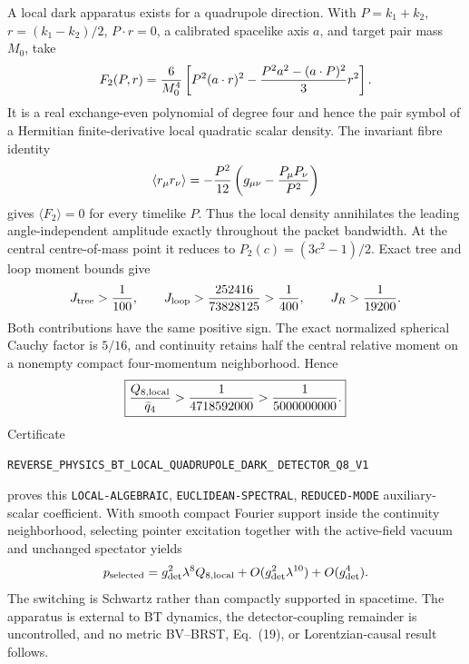 \documentclass[11pt]{article}
\theoremstyle{definition}
\theoremstyle{remark}
\begin{document}
A local dark apparatus exists for a quadrupole direction.  With
$P=k_1+k_2$, $r=(k_1-k_2)/2$, $P\mathbin{\cdot}r=0$, a calibrated spacelike
axis $a$, and target pair mass $M_0$, take
\[
 F_2(P,r)={6\over M_0^4}\left[
 P^2(a\mathbin{\cdot}r)^2
 -{P^2a^2-(a\mathbin{\cdot}P)^2\over3}r^2\right].
\]
It is a real exchange-even polynomial of degree four and hence the pair
symbol of a Hermitian finite-derivative local quadratic scalar density.  The
invariant fibre identity
\[
 \langle r_\mu r_\nu\rangle
 =-{P^2\over12}\left(g_{\mu\nu}-{P_\mu P_\nu\over P^2}\right)
\]
gives $\langle F_2\rangle=0$ for every timelike $P$.  Thus the local density
annihilates the leading angle-independent amplitude exactly throughout the
packet bandwidth.  At the central centre-of-mass point it reduces to
$P_2(c)=(3c^2-1)/2$.  Exact tree and loop moment bounds give
\[
 J_{\rm tree}>{1\over100},\qquad
 J_{\rm loop}>{252416\over73828125}>{1\over400},
 \qquad J_R>{1\over19200}.
\]
Both contributions have the same positive sign.  The exact normalized
spherical Cauchy factor is $5/16$, and continuity retains half the central
relative moment on a nonempty compact four-momentum neighborhood.  Hence
\[
 \boxed{{Q_{8,\mathrm{local}}\over\bar q_4}
 >{1\over4718592000}>{1\over5000000000}.}
\]
Certificate
\par\noindent
\texttt{REVERSE\_PHYSICS\_BT\_LOCAL\_QUADRUPOLE\_DARK\_}
\allowbreak\texttt{DETECTOR\_Q8\_V1}
\par\noindent
proves this \texttt{LOCAL-ALGEBRAIC}, \texttt{EUCLIDEAN-SPECTRAL},
\texttt{REDUCED-MODE} auxiliary-scalar coefficient.  With smooth compact
Fourier support inside the continuity neighborhood, selecting pointer
excitation together with the active-field vacuum and unchanged spectator
yields
\[
 p_{\rm selected}=g_{\rm det}^2\lambda^8Q_{8,\mathrm{local}}
 +O(g_{\rm det}^2\lambda^{10})+O(g_{\rm det}^4).
\]
The switching is Schwartz rather than compactly supported in spacetime.  The
apparatus is external to BT dynamics, the detector-coupling remainder is
uncontrolled, and no metric BV--BRST, Eq.~(19), or Lorentzian-causal result
follows.
\end{document}
